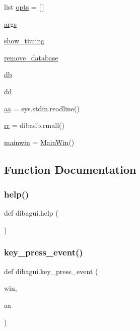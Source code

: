 \begin{DoxyCompactItemize}
\item 
list \hyperlink{namespacedibagui_aa17b9f50d41f0a8e95659986136435dd}{opts} = \mbox{[}$\,$\mbox{]}
\item 
\hyperlink{namespacedibagui_a8187411843a6284ffb964ef3fb9fcab3}{args}
\item 
\hyperlink{namespacedibagui_a721390ce85369efa83cf64d0f62cba4b}{show\+\_\+timing}
\item 
\hyperlink{namespacedibagui_a1f942d68f5d92c52e0cfd6568c308788}{remove\+\_\+database}
\item 
\hyperlink{namespacedibagui_a89a7f6028a19c3dc081cc5f16eb53891}{db}
\item 
\hyperlink{namespacedibagui_a11ddbaf3386aea1f2974eee984542152}{dd}
\item 
\hyperlink{namespacedibagui_a74b87337454200d4d33f80c4663dc5e5}{aa} = sys.\+stdin.\+readline()
\item 
\hyperlink{namespacedibagui_aeb9279982226a42afdf2860dbdc29b45}{rr} = dibadb.\+rmall()
\item 
\hyperlink{namespacedibagui_a782c1a3f26f508cb307533b6bde86508}{mainwin} = \hyperlink{classdibagui_1_1_main_win}{Main\+Win}()
\end{DoxyCompactItemize}


\subsection{Function Documentation}
\mbox{\label{namespacedibagui_ab3b526f5276db90995805fd06c280b74}} 
\subsubsection{\texorpdfstring{help()}{help()}}
{\footnotesize\ttfamily def dibagui.\+help (\begin{DoxyParamCaption}{ }\end{DoxyParamCaption})}

\mbox{\label{namespacedibagui_af9201c0c99ec1ad4e21908a912bac70b}} 
\subsubsection{\texorpdfstring{key\+\_\+press\+\_\+event()}{key\_press\_event()}}
{\footnotesize\ttfamily def dibagui.\+key\+\_\+press\+\_\+event (\begin{DoxyParamCaption}\item[{}]{win,  }\item[{}]{aa }\end{DoxyParamCaption})}

